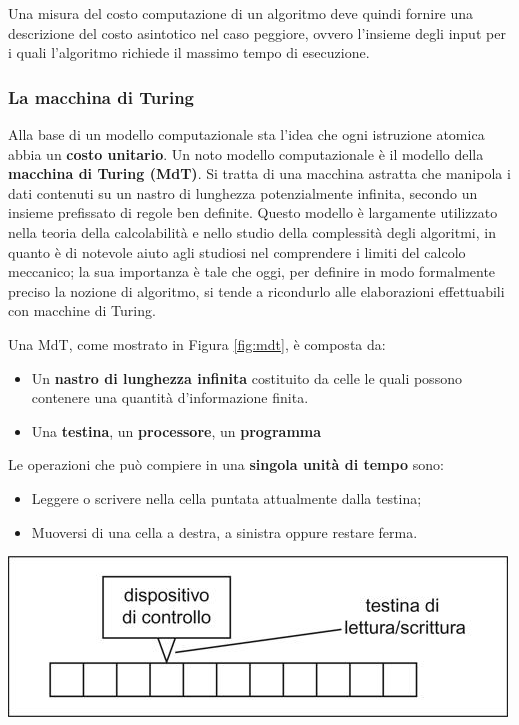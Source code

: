 Una misura del costo computazione di un algoritmo deve quindi fornire una descrizione del costo asintotico nel caso peggiore, ovvero l'insieme degli input per i quali l'algoritmo richiede il massimo tempo di esecuzione.


\subsubsection{La macchina di Turing}\label{sez:Turing}
Alla base di un modello computazionale sta l'idea che ogni istruzione atomica abbia un \textbf{costo unitario}. Un noto modello computazionale è il modello della \textbf{macchina di Turing (MdT)}. Si tratta di una macchina astratta che manipola i dati contenuti su un nastro di lunghezza potenzialmente infinita, secondo un insieme prefissato di regole ben definite. Questo modello è largamente utilizzato nella teoria della calcolabilità e nello studio della complessità degli algoritmi, in quanto è di notevole aiuto agli studiosi nel comprendere i limiti del calcolo meccanico; la sua importanza è tale che oggi, per definire in modo formalmente preciso la nozione di algoritmo, si tende a ricondurlo alle elaborazioni effettuabili con macchine di Turing.

Una MdT, come mostrato in Figura \ref{fig:mdt}, è composta da:
\begin{itemize}
    \item Un \textbf{nastro di lunghezza infinita} costituito da celle le quali possono contenere una quantità d'informazione finita.
    \item Una \textbf{testina}, un \textbf{processore}, un \textbf{programma}
\end{itemize}

Le operazioni che può compiere in una \textbf{singola unità di tempo} sono:
\begin{itemize}
    \item Leggere o scrivere nella cella puntata attualmente dalla testina;
    \item Muoversi di una cella a destra, a sinistra oppure restare ferma.
\end{itemize}

\begin{center}
    \includegraphics[scale = 0.4, origin = c]{res/Macchina_di_Turing.jpg}
    \label{fig:mdt}
\end{center}

